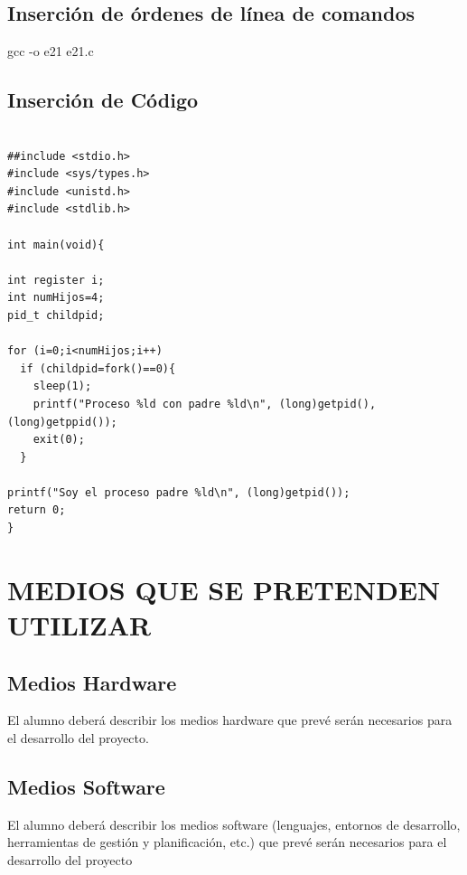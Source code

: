 \documentclass{pre-tfg}
\begin{document}
\subsection{Inserción de órdenes de línea de comandos}

\begin{listing}[style=consola, numbers=none]
 gcc  -o e21 e21.c
\end{listing}





\subsection{Inserción de Código}

\begin{lstlisting}[caption=Ejemplo de código,style=C]

##include <stdio.h>
#include <sys/types.h>
#include <unistd.h>
#include <stdlib.h>

int main(void){

int register i;
int numHijos=4;
pid_t childpid;

for (i=0;i<numHijos;i++)
  if (childpid=fork()==0){
    sleep(1);
    printf("Proceso %ld con padre %ld\n", (long)getpid(), (long)getppid());
    exit(0);
  }

printf("Soy el proceso padre %ld\n", (long)getpid());
return 0;
}
\end{lstlisting}




\section{MEDIOS QUE SE PRETENDEN UTILIZAR}

\subsection{Medios Hardware}

El alumno deberá describir los medios hardware que prevé serán necesarios para el
desarrollo del proyecto.


\subsection{Medios Software}

El alumno deberá describir los medios software (lenguajes, entornos de desarrollo,
herramientas de gestión y planificación, etc.) que prevé serán necesarios para el
desarrollo del proyecto
\end{document}
